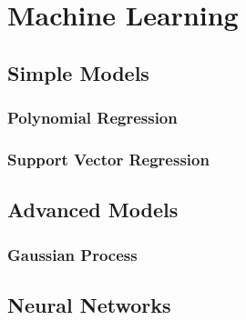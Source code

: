 \section{Machine Learning}

\subsection{Simple Models}

\subsubsection{Polynomial Regression}

\subsubsection{Support Vector Regression}


\subsection{Advanced Models}

\subsubsection{Gaussian Process}

\subsection{Neural Networks}